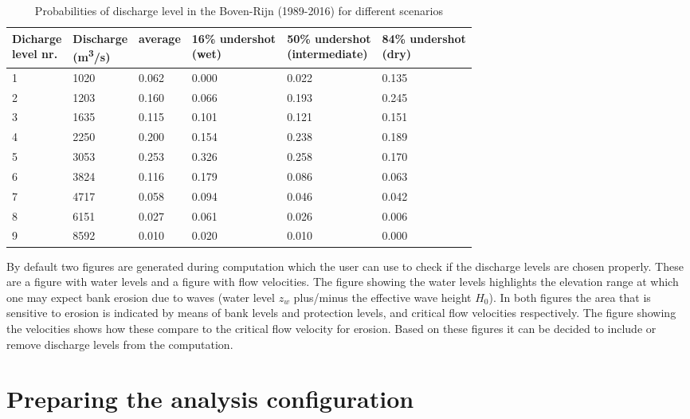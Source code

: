 \begin{table}[h]
\center
\begin{tabular}{p{1.25cm}p{1.5cm}p{2cm}p{2.25cm}p{2.25cm}p{2.25cm}}
\makecell[l]{Dicharge\\level nr.} & \makecell[l]{Discharge\\(m\textsuperscript{3}/s)} & \makecell[l]{average\\ } & \makecell[l]{16\% undershot\\(wet)} & \makecell[l]{50\% undershot\\(intermediate)} & \makecell[l]{84\% undershot\\(dry)}\\ \hline
1 & 1020 & 0.062 & 0.000 & 0.022 & 0.135 \\
2 & 1203 & 0.160 & 0.066 & 0.193 & 0.245 \\
3 & 1635 & 0.115 & 0.101 & 0.121 & 0.151 \\
4 & 2250 & 0.200 & 0.154 & 0.238 & 0.189 \\
5 & 3053 & 0.253 & 0.326 & 0.258 & 0.170 \\
6 & 3824 & 0.116 & 0.179 & 0.086 & 0.063 \\
7 & 4717 & 0.058 & 0.094 & 0.046 & 0.042 \\
8 & 6151 & 0.027 & 0.061 & 0.026 & 0.006 \\
9 & 8592 & 0.010 & 0.020 & 0.010 & 0.000 \\
\hline
\end{tabular}
\caption{Probabilities of discharge level in the Boven-Rijn (1989-2016) for different scenarios}
\label{Tab2.2}
\end{table}

By default two figures are generated during \dfastbe computation which the user can use to check if the discharge levels are chosen properly.
These are a figure with water levels and a figure with flow velocities.
The figure showing the water levels highlights the elevation range at which one may expect bank erosion due to waves (water level $z_w$ plus/minus the effective wave height $H_0$).
In both figures the area that is sensitive to erosion is indicated by means of bank levels and protection levels, and critical flow velocities respectively.
The figure showing the velocities shows how these compare to the critical flow velocity for erosion.
Based on these figures it can be decided to include or remove discharge levels from the computation.



\section{Preparing the analysis configuration} \label{Sec:Prepare}

